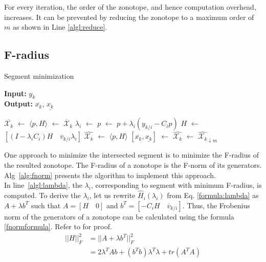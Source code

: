 For every iteration, the order of the zonotope, and hence computation overhead, increases. It can be prevented by reducing the zonotope to a maximum order of $m$ as shown in Line \ref{algl:reduce}.

\subsection{F-radius}
\begin{algorithm}[H]
        \caption{Segment minimization}
        \textbf{Input:} $y_k$\\
 		\textbf{Output:} $\overline{x_k}$, $\underline{x_k}$
        \begin{algorithmic}[1]
        \State $\overline{\mathcal{X}_k}$ $\gets$ 
        \State $\langle p,H \rangle$ $\gets$ $\mathcal{\overline{X}}_k$
        	\State $\lambda_i$ $\gets$  \label{algl:lambda}
        	\State $p$ $\gets$ $p + \lambda_i (y_{k/i} - C_i p)$ \label{algl:center}
        	\State $H$ $\gets$ $[(I- \lambda_i C_i)H \quad \overline{v}_{k/i}\lambda_i]$  \label{algl:g}
        \EndFor
        \State $\hat{\mathcal{X}_k}$ $\gets$ $\langle p, H \rangle$
        \State $[\overline{x_k}, \underline{x_k}]$ $\gets$ 
        \State $\hat{\mathcal{X}_k}$ $\gets$ $\hat{\mathcal{X}_k}_{\downarrow m}$
        \end{algorithmic}
        \label{alg:fnorm}
\end{algorithm}
One approach to minimize the intersected segment is to minimize the F-radius of the resulted zonotope. The F-radius of a zonotope is the F-norm of its generators. Alg~\ref{alg:fnorm} presents the algorithm to implement this approach.\\
In line~\ref{algl:lambda}, the $\lambda_i$, corresponding to segment with minimum F-radius, is computed. To derive the $\lambda_i$, let us rewrite $\hat{H}_i(\lambda_i)$ from Eq. \ref{formula:lambda} as $A + \lambda b^T$ such that $A= [H \quad 0]$ and $b^T = [-C_i H \quad \overline{v}_{k/i}]$. Thus, the Frobenius norm of the generators of a zonotope can be calculated using the formula \eqref{fnormformula}. Refer to \cite{Alamo2005} for proof.
\begin{equation}
\label{fnormformula}
\begin{split}
||H||_{F}^2 & = ||A + \lambda b^T||^{2}_F \\
&= 2\lambda^T A b+ (b^Tb)\lambda^T\lambda + tr(A^TA)
\end{split}
\end{equation}

